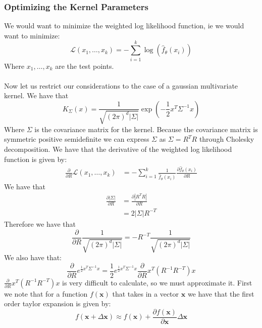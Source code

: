 \documentclass[10pt]{article}
\begin{document}
\subsubsection{Optimizing the Kernel Parameters}
We would want to minimize the weighted log likelihood function, ie we would want to minimize:
\begin{equation}
    \mathcal{L}(x_1,\dots,x_k) = -\sum_{i=1}^k \log(\hat{f}_{\theta}(x_i))
\end{equation}
Where $x_1,\dots,x_k$ are the test points.\\\\
Now let us restrict our considerations to the case of a gaussian multivariate kernel. We have that
$$K_{\Sigma}(x) = \frac{1}{\sqrt{(2\pi)^d|\Sigma|}}\exp\left(-\frac{1}{2}x^T\Sigma^{-1}x\right)$$
Where $\Sigma$ is the covariance matrix for the kernel. Because the 
covariance matrix is symmetric positive semidefinite 
we can express $\Sigma$ as $\Sigma = R^TR$ through Cholesky decomposition.
We have that the derivative of the 
weighted log likelihood function is given by:
\begin{align*}
    \frac{\partial}{\partial R}\mathcal{L}(x_1,\dots,x_k) &= -\sum_{i=1}^k \frac{1}{\hat{f}_{\theta}(x_i)} \frac{\partial \hat{f}_{\theta}(x_i)}{\partial R}
\end{align*}
We have that 
\begin{align*}
    \frac{\partial |\Sigma|}{\partial R} &= \frac{\partial |R^TR|}{\partial R} \\
    &= 2|\Sigma|R^{-T}
\end{align*}
Therefore we have that 
\begin{equation}
    \frac{\partial}{\partial R}\frac{1}{\sqrt{(2\pi)^d|\Sigma|}} = -R^{-T}\frac{1}{\sqrt{(2\pi)^d|\Sigma|}}
\end{equation}
We also have that:
\begin{equation}
    \frac{\partial}{\partial R} e^{\frac{1}{2}x^T\Sigma^{-1}x} = \frac{1}{2}e^{\frac{1}{2}x^T\Sigma^{-1}x} \frac{\partial}{\partial R} x^T(R^{-1}R^{-T})x
\end{equation}
$\frac{\partial}{\partial R} x^T(R^{-1}R^{-T})x$ is very difficult to calculate, so we must approximate it. First we note that for 
a function $f(\mathbf{x})$ that takes in a vector $\mathbf{x}$ we have that the first order taylor expansion is given by:
\begin{equation}
    f(\mathbf{x}+\Delta \mathbf{x}) \approx f(\mathbf{x}) + \frac{\partial f(\mathbf{x})}{\partial \mathbf{x}}\Delta \mathbf{x}
\end{equation}
\end{document}
